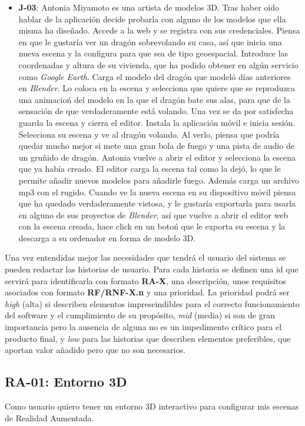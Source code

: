 \begin{itemize}
    \item \textbf{J-03}: Antonia Miyamoto es una artista de modelos 3D. Tras haber oido hablar de la aplicación decide probarla con alguno de los modelos que ella misma ha diseñado. Accede a la web y se registra con sus credenciales. Piensa en que le gustaría ver un dragón sobrevolando su casa, así que inicia una nueva escena y la configura para que sea de tipo geoespacial. Introduce las coordenadas y altura de su vivienda, que ha podido obtener en algún servicio como \textit{Google Earth}. Carga el modelo del dragón que modeló días anteriores en \textit{Blender}. Lo coloca en la escena y selecciona que quiere que se reproduzca una animacioń del modelo en la que el dragón bate sus alas, para que de la sensación de que verdaderamente está volando. Una vez se da por satisfecha guarda la escena y cierra el editor. Instala la aplicación móvil e inicia sesión. Selecciona su escena y ve al dragón volando. Al verlo, piensa que podría quedar mucho mejor si mete una gran bola de fuego y una pista de audio de un gruñido de dragón. Antonia vuelve a abrir el editor y selecciona la escena que ya había creado. El editor carga la escena tal como la dejó, lo que le permite añadir nuevos modelos para añadirle fuego. Además carga un archivo mp3 con el rugido. Cuando ve la nueva escena en su dispositivo móvil piensa que ha quedado verdaderamente vistosa, y le gustaría exportarla para usarla en alguno de sus proyectos de \textit{Blender}, así que vuelve a abrir el editor web con la escena creada, hace click en un botoń que le exporta su escena y la descarga a su ordenador en forma de modelo 3D.
\end{itemize}

Una vez entendidas mejor las necesidades que tendrá el usuario del sistema se pueden redactar las historias de usuario. Para cada historia se definen una id que servirá para identificarla con formato \textbf{RA-X}, una descripción, unos requisitos asociados con formato \textbf{RF/RNF-X.n} y una prioridad. La prioridad podrá ser \textit{high} (alta) si describen elementos imprescindibles para el correcto funcionamiento del software y el cumplimiento de su propósito, \textit{mid} (media) si son de gran importancia pero la ausencia de alguna no es un impedimento crítico para el producto final, y \textit{low} para las historias que describen elementos preferibles, que aportan valor añadido pero que no son necesarios.

\subsection{RA-01: Entorno 3D}
Como usuario quiero tener un entorno 3D interactivo para configurar mis escenas de Realidad Aumentada.

